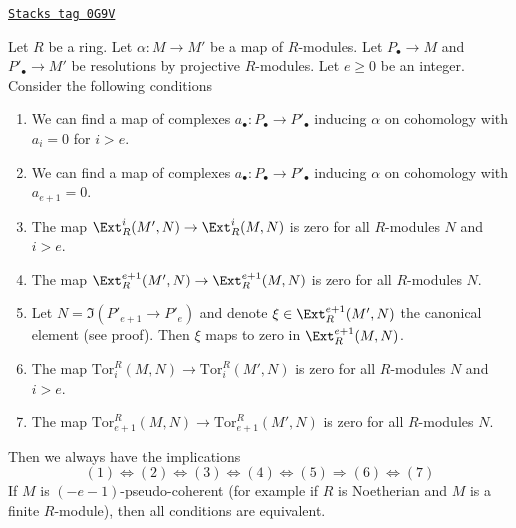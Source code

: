 \begin{lemma}
\label{local-cohomology-lemma-characterize-vanishing-tor-ext-above-e}
\href{https://stacks.math.columbia.edu/tag/0G9V}{\texttt{Stacks tag 0G9V}}

Let $R$ be a ring. Let $\alpha : M \to M'$ be a map of $R$-modules.
Let $P_\bullet \to M$ and $P'_\bullet \to M'$ be resolutions by
projective $R$-modules. Let $e \geq 0$ be an integer.
Consider the following conditions
\begin{enumerate}
\item We can find a map of complexes $a_\bullet : P_\bullet \to P'_\bullet$
inducing $\alpha$ on cohomology with $a_i = 0$ for $i > e$.
\item We can find a map of complexes $a_\bullet : P_\bullet \to P'_\bullet$
inducing $\alpha$ on cohomology with $a_{e + 1} = 0$.
\item The map $\Ext^i_R(M', N) \to \Ext^i_R(M, N)$ is zero
for all $R$-modules $N$ and $i > e$.
\item The map $\Ext^{e + 1}_R(M', N) \to \Ext^{e + 1}_R(M, N)$ is zero
for all $R$-modules $N$.
\item Let $N = \Im(P'_{e + 1} \to P'_e)$ and denote
$\xi \in \Ext^{e + 1}_R(M', N)$ the canonical element (see proof).
Then $\xi$ maps to zero in $\Ext^{e + 1}_R(M, N)$.
\item The map $\text{Tor}_i^R(M, N) \to \text{Tor}_i^R(M', N)$
is zero for all $R$-modules $N$ and $i > e$.
\item The map $\text{Tor}_{e + 1}^R(M, N) \to \text{Tor}_{e + 1}^R(M', N)$
is zero for all $R$-modules $N$.
\end{enumerate}
Then we always have the implications
$$
(1) \Leftrightarrow (2) \Leftrightarrow (3) \Leftrightarrow (4)
\Leftrightarrow (5) \Rightarrow (6) \Leftrightarrow (7)
$$
If $M$ is $(-e - 1)$-pseudo-coherent (for example if $R$ is Noetherian
and $M$ is a finite $R$-module), then all conditions
are equivalent.
\end{lemma}

